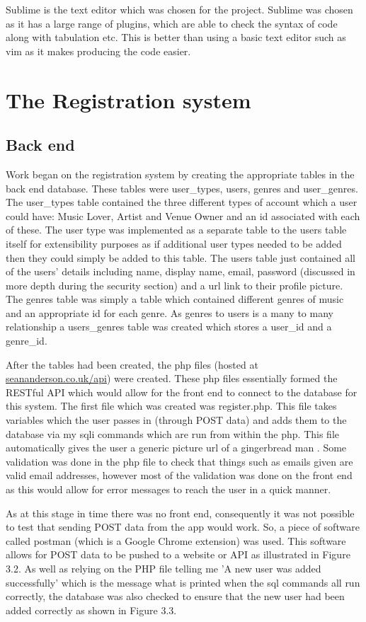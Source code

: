 Sublime is the text editor which was chosen for the project. Sublime was chosen as it has a large range of plugins, which are able to check the syntax of code along with tabulation etc. This is better than using a basic text editor such as vim as it makes producing the code easier.

\section{The Registration system}
\subsection{Back end}
Work began on the registration system by creating the appropriate tables in the back end database. These tables were user\_types, users, genres and user\_genres. The user\_types table contained the three different types of account which a user could have: Music Lover, Artist and Venue Owner and an id associated with each of these. The user type was implemented as a separate table to the users table itself for extensibility purposes as if additional user types needed to be added then they could simply be added to this table. The users table just contained all of the users' details including name, display name, email, password (discussed in more depth during the security section) and a url link to their profile picture. The genres table was simply a table which contained different genres of music and an appropriate id for each genre. As genres to users is a many to many relationship a users\_genres table was created which stores a user\_id and a genre\_id.

After the tables had been created, the php files (hosted at \url{seananderson.co.uk/api}) were created. These php files essentially formed the RESTful API which would allow for the front end to connect to the database for this system. The first file which was created was register.php. This file takes variables which the user passes in (through POST data) and adds them to the database via my sqli commands which are run from within the php. This file automatically gives the user a generic picture url of a gingerbread man \cite{ginger}. Some validation was done in the php file to check that things such as emails given are valid email addresses, however most of the validation was done on the front end as this would allow for error messages to reach the user in a quick manner. 

As at this stage in time there was no front end, consequently it was not possible to test that sending POST data from the app would work. So, a piece of software called postman (which is a Google Chrome extension) was used. This software allows for POST data to be pushed to a website or API as illustrated in Figure 3.2. As well as relying on the PHP file telling me 'A new user was added successfully' which is the message what is printed when the sql commands all run correctly, the database was also checked to ensure that the new user had been added correctly as shown in Figure 3.3.


